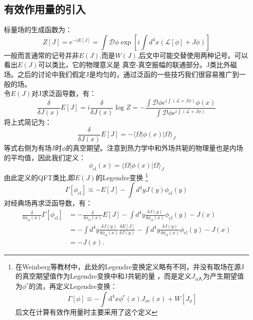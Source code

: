 \documentclass{article}
\begin{document}
\subsection{有效作用量的引入}
 标量场的生成函数为：
 \begin{equation}
  Z[J]=e^{-i E[J]}=\int \mathcal{D} \phi \exp \left[i \int d^4 x(\mathcal{L}[\phi]+J \phi)\right]
 \end{equation}
 一般而言通常的记号并非$ E(J) $,而是$ W(J) $,后文中可能交替使用两种记号。可以看出$ E(J) $可以类比\hf ，它的物理意义是
 真空-真空振幅的联通部分。J类比外磁场。之后的讨论中我们假定J是均匀的，通过泛函的一些技巧我们很容易推广到一般的场。\\
 令$ E(J) $对J求泛函导数，有：
 \begin{equation}
  \frac{\delta}{\delta J(x)} E[J]=i \frac{\delta}{\delta J(x)} \log Z=-\frac{\int \mathcal{D} \phi e^{i \int(\mathcal{L}+J \phi)} \phi(x)}{\int \mathcal{D} \phi e^{i \int(\mathcal{L}+J \phi)}}
 \end{equation}  
将上式简记为：
\begin{equation}
  \frac{\delta}{\delta J(x)} E[J]=-\langle\Omega|\phi(x)| \Omega\rangle_J
\end{equation}
等式右侧为有场J时$ \phi $的真空期望。注意到热力学中和外场共轭的物理量也是内场的平均值，因此我们定义：
\begin{equation}
  \phi_{\mathrm{cl}}(x)=\langle\Omega|\phi(x)| \Omega\rangle_J
  \label{defofcf}
\end{equation}
由此定义\gf 的QFT类比,即$ E(J) $的Legendre变换
\footnote{在Weinberg等教材中，此处的Legendre变换定义略有不同，并没有取场在源J的真空期望值作为Legendre变换中和J共轭的量
，而是定义$ J_{\phi 人} $为产生期望值为$ \phi^r $的流，再定义Legendre变换：
\begin{equation}
  \Gamma[\phi] \equiv-\int \mathrm{d}^4 x \phi^r(x) J_{\phi r}(x)+W\left[J_\phi\right]
  \label{defofw}
\end{equation}  
后文在计算有效作用量时主要采用了这个定义}
\\
\begin{equation}
  \Gamma\left[\phi_{\mathrm{cl}}\right] \equiv-E[J]-\int d^4 y J(y) \phi_{\mathrm{cl}}(y)
  \label{defofea}
\end{equation} 
对经典场再求泛函导数，有：
\begin{equation}
  \begin{aligned}
    \frac{\delta}{\delta \phi_{\mathrm{cl}}(x)} \Gamma\left[\phi_{\mathrm{cl}}\right] & =-\frac{\delta}{\delta \phi_{\mathrm{cl}}(x)} E[J]-\int d^4 y \frac{\delta J(y)}{\delta \phi_{\mathrm{cl}}(x)} \phi_{\mathrm{cl}}(y)-J(x) \\
    & =-\int d^4 y \frac{\delta J(y)}{\delta \phi_{\mathrm{cl}}(x)} \frac{\delta E[J]}{\delta J(y)}-\int d^4 y \frac{\delta J(y)}{\delta \phi_{\mathrm{cl}}(x)} \phi_{\mathrm{cl}}(y)-J(x) \\
    & =-J(x) .
    \end{aligned}
\end{equation}
\end{document}
